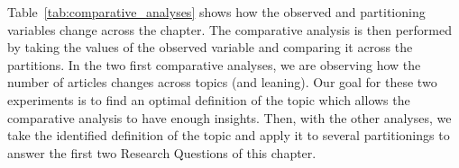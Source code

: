 Table~\ref{tab:comparative_analyses} shows how the observed and partitioning variables change across the chapter.
The comparative analysis is then performed by taking the values of the observed variable and comparing it across the partitions.
In the two first comparative analyses, we are observing how the number of articles changes across topics (and leaning). Our goal for these two experiments is to find an optimal definition of the topic which allows the comparative analysis to have enough insights.
Then, with the other analyses, we take the identified definition of the topic and apply it to several partitionings to answer the first two Research Questions of this chapter.













